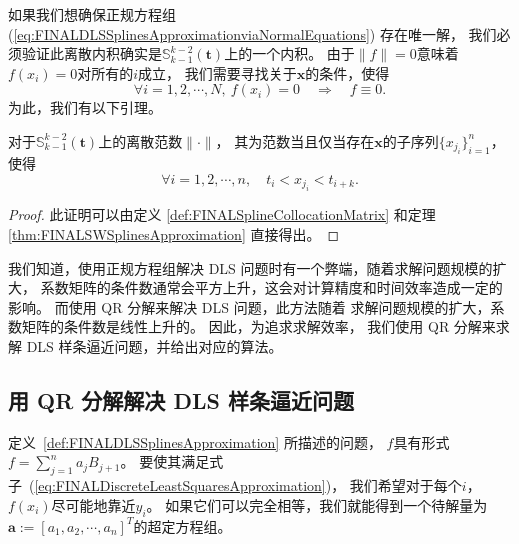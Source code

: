   如果我们想确保正规方程组
  (\ref{eq:FINALDLSSplinesApproximationviaNormalEquations}) 存在唯一解，
  我们必须验证此离散内积确实是$\mathbb{S}_{k-1}^{k-2}(\mathbf{t})$上的一个内积。
  由于$\|f\| = 0$意味着$f(x_{i})=0$对所有的$i$成立，
  我们需要寻找关于$\mathbf{x}$的条件，使得
  \begin{displaymath}
    \forall i=1,2,\cdots,N,\ f(x_i) = 0
    \quad\Longrightarrow \quad f\equiv 0. 
  \end{displaymath}
  为此，我们有以下引理。
  \begin{lem}
    \label{lem:FINALSWconditionForDLSspline}
    对于$\mathbb{S}_{k-1}^{k-2}(\mathbf{t})$上的离散范数$\|\cdot\|$，
    其为范数当且仅当存在$\mathbf{x}$的子序列$\{x_{j_{i}}\}_{i=1}^{n}$，使得
    \begin{displaymath}
      \forall i=1,2,\cdots,n,\quad t_i < x_{j_i} < t_{i+k}.
    \end{displaymath}
  \end{lem}
  \begin{proof}
    此证明可以由定义 \ref{def:FINALSplineCollocationMatrix}
    和定理 \ref{thm:FINALSWSplinesApproximation} 直接得出。
  \end{proof}

  我们知道，使用正规方程组解决 DLS 问题时有一个弊端，随着求解问题规模的扩大，
  系数矩阵的条件数通常会平方上升，这会对计算精度和时间效率造成一定的影响。
  而使用 QR 分解来解决 DLS 问题，此方法随着
  求解问题规模的扩大，系数矩阵的条件数是线性上升的。
  因此，为追求求解效率，
  我们使用 QR 分解来求解 DLS 样条逼近问题，并给出对应的算法。

\subsection{用 QR 分解解决 DLS 样条逼近问题}
\label{subsec:FINALDLSSplinesApproximationviaQRdecomp}

  定义~\ref{def:FINALDLSSplinesApproximation} 所描述的问题，
  $f$具有形式$f=\sum_{j=1}^{n}a_{j}B_{j+1}$。
  要使其满足式子~(\ref{eq:FINALDiscreteLeastSquaresApproximation})，
  我们希望对于每个$i$，$f(x_{i})$尽可能地靠近$y_{i}$。
  如果它们可以完全相等，我们就能得到一个待解量为
   $\mathbf{a}:=[a_{1},a_{2},\cdots,a_{n}]^{T}$的超定方程组。

